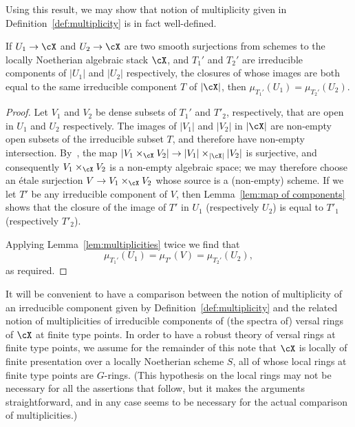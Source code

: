 Using this result, we may show that notion of multiplicity
given in
Definition~\ref{def:multiplicity} is in fact well-defined.

\begin{alemma}
If $U_1 \to \cX$ and $U_2 \to \cX$ are two smooth surjections from
schemes to the locally Noetherian algebraic stack $\cX$,
and $T_1'$ and $T_2'$ are irreducible components of $|U_1|$
and $|U_2|$ respectively, the closures of whose images
are both equal to the same irreducible component $T$ of $|\cX|$,
then $\mu_{T_1'}(U_1) = \mu_{T_2'}(U_2)$.
\end{alemma}
\begin{proof}
Let $V_1$ and $V_2$ be dense subsets of $T_1'$ and $T'_2$, respectively,
that are open in $U_1$ and $U_2$ respectively.
The images of $|V_1|$ and $|V_2|$ in $|\cX|$ are non-empty open 
subsets of the irreducible subset $T$, and therefore have non-empty
intersection.
By~\cite[\href{http://stacks.math.columbia.edu/tag/04XH}{Tag
    04XH}]{stacks-project}, the map $|V_1\times_\cX V_2|\to
  |V_1|\times_{|\cX|}|V_2|$ is surjective,
and consequently $V_1\times_{\cX} V_2$ is a non-empty algebraic
space; we may therefore choose an \'etale surjection 
$V \to V_1\times_{\cX} V_2$ whose source is a (non-empty) scheme.
If we let $T'$ be any irreducible component of $V$,
then Lemma~\ref{lem:map of components} shows that the closure of
the image of $T'$ in $U_1$ (respectively $U_2$) is equal to $T'_1$
(respectively $T'_2$).

Applying
  Lemma~\ref{lem:multiplicities} twice we find
  that \[\mu_{T_1'}(U_1)=\mu_{T'}(V)=\mu_{T_2'}(U_2),\]as required.
\end{proof} 

It will be convenient to have a comparison between the notion of multiplicity
of an irreducible component given by Definition~\ref{def:multiplicity}
and the related notion of multiplicities of irreducible
components of (the spectra of) versal rings of $\cX$ at finite type points.
In order to have a robust theory of versal rings at finite type points,
we assume for the remainder of this note that $\cX$ is locally
of finite presentation
over a locally Noetherian scheme $S$, all of whose local rings
at finite type points are $G$-rings.  (This hypothesis on the local rings
may not be necessary for all the assertions that follow, but it makes the
arguments straightforward, and in any case seems to be necessary
for the actual comparison of multiplicities.)

